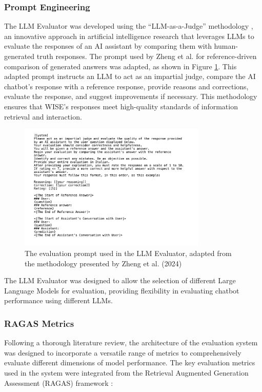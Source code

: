 \subsubsection{Prompt Engineering}

The LLM Evaluator was developed using the “LLM-as-a-Judge” methodology \cite{zheng2024judging}, an innovative approach in artificial intelligence research that leverages LLMs to evaluate the responses of an AI assistant by comparing them with human-generated truth responses. The prompt used by Zheng et al. \cite{zheng2024judging} for reference-driven comparison of generated answers was adapted, as shown in Figure \ref{fig:llme-prompt}. This adapted prompt instructs an LLM to act as an impartial judge, compare the AI chatbot's response with a reference response, provide reasons and corrections, evaluate the response, and suggest improvements if necessary. This methodology ensures that WISE's responses meet high-quality standards of information retrieval and interaction.

\begin{figure}[h!]
    \centering
    \includegraphics[width=0.8\textwidth]{images/llme/llme-prompt.png}
    \caption{The evaluation prompt used in the LLM Evaluator, adapted from the methodology presented by Zheng et al. (2024) \cite{zheng2024judging}}
    \label{fig:llme-prompt}
\end{figure}

 The LLM Evaluator was designed to allow the selection of different Large Language Models for evaluation, providing flexibility in evaluating chatbot performance using different LLMs.

\subsubsection{RAGAS Metrics}
Following a thorough literature review, the architecture of the evaluation system was designed to incorporate a versatile range of metrics to comprehensively evaluate different dimensions of model performance. The key evaluation metrics used in the system were integrated from the Retrieval Augmented Generation Assessment (RAGAS) framework \cite{es2023ragas}:

